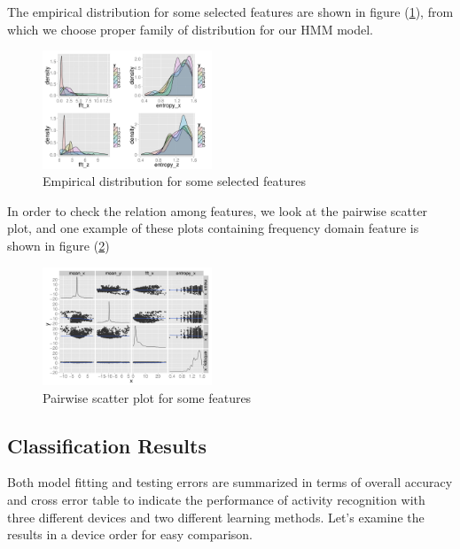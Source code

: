 The empirical distribution for some selected features are shown in figure (\ref{fig:features}), from which we choose proper family of distribution for our HMM model. 

\begin{figure}
  \centering
  \includegraphics[width=0.45\textwidth]{figures/edafeature2.pdf}
  \caption{Empirical distribution for some selected features}
  \label{fig:features}
\end{figure}

In order to check the relation among features, we look at the pairwise scatter plot, and one  example of these plots containing frequency domain feature is shown in figure (\ref{fig:pairwise})

\begin{figure}
  \centering
  \includegraphics[width=0.45\textwidth]{figures/edafeature1.pdf}
  \caption{Pairwise scatter plot for some features}
  \label{fig:pairwise}
\end{figure}


\subsection{Classification Results}

Both model fitting and testing errors are summarized in terms of overall accuracy and cross error table to indicate the performance of activity recognition with three different devices and two different learning methods. Let's examine the results in a device order for easy comparison.

